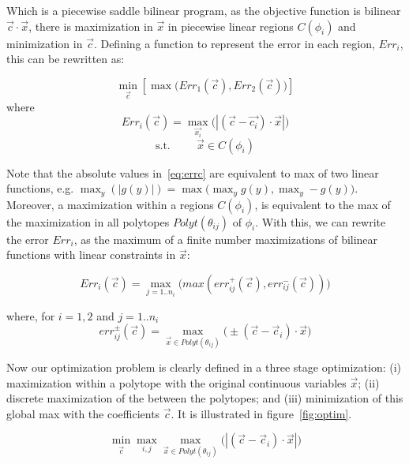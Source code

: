 Which is a piecewise saddle bilinear program, as the objective function is bilinear $\vec{c} \cdot \vec{x}$, there is maximization in $\vec{x}$ in piecewise linear regions $C(\phi_i)$ and minimization in $\vec{c}$. Defining a function to represent the error in each region, $Err_i$, this can be rewritten as:

\begin{equation} \min_{\vec{c}} \left[ \max \big( Err_1(\vec{c}), Err_2(\vec{c}) \big) \right] \label{eq:minc} \end{equation}
where
\begin{equation} Err_i(\vec{c}) = \max_{\vec{x_i}} \big(  | (\vec{c}-\vec{c_i}) \cdot \vec{x} |\big) \label{eq:errc} \end
{equation}
$$\text{s.t.} \hspace{1cm} \vec{x} \in C(\phi_i)$$

Note that the absolute values in~\ref{eq:errc} are equivalent to max of two linear functions, e.g. $\max_y (|g(y)|) = \max \big( \max_y g(y), \max_y -g(y) \big)$. Moreover, a maximization within a regions $C(\phi_i)$, is equivalent to the max of the maximization in all polytopes $Polyt(\theta_{ij})$ of $\phi_i$. With this, we can rewrite the error $Err_i$, as the maximum of a finite number maximizations of bilinear functions with linear constraints in $\vec{x}$:
{\footnotesize 
\vspace{-2mm}
\begin{equation} Err_i(\vec{c}) = \max_{j=1..n_i} \big( max ( err^+_{ij}(\vec{c}), err^-_{ij}(\vec{c}) ) \big) \label{eq:errcij} \end{equation}
\vspace{-5mm}

where, for $i=1,2$ and $j=1..n_i$
\vspace{-1mm}
\begin{equation} err^{\pm}_{ij}(\vec{c}) = \max_{\vec{x} \in Polyt(\theta_{ij})} \big( \pm(\vec{c} - \vec{c}_i)\cdot \vec{x} \big)  \label{eq:polymax} \end{equation}
\vspace{-2mm}
}

Now our optimization problem is clearly defined in a three stage optimization: (i) maximization within a polytope with the original continuous variables $\vec{x}$; (ii) discrete maximization of the between the polytopes; and (iii) minimization of this global max with the coefficients $\vec{c}$. It is illustrated in figure~\ref{fig:optim}.

\begin{equation} \min_{\vec{c}} \max_{i,j} \max_{\vec{x} \in Polyt(\theta_{ij})} \big( |(\vec{c} - \vec{c}_i)\cdot \vec{x}| \big)  \label{eq:optimglo} \end{equation}


